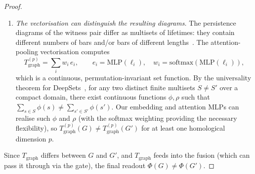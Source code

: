 \begin{proof}
\begin{enumerate}
    \item \emph{The vectorisation can distinguish the resulting diagrams.} The persistence diagrams of the witness pair differ as multisets of lifetimes: they contain different numbers of bars and/or bars of different lengths~\cite{hofer2023expressivity}. The attention-pooling vectorisation computes
    \[
        T^{(p)}_{\mathrm{graph}} = \sum_i w_i \, e_i, \qquad e_i = \mathrm{MLP}(\ell_i), \quad w_i = \mathrm{softmax}(\mathrm{MLP}(\ell_i)),
    \]
    which is a continuous, permutation-invariant set function. By the universality theorem for DeepSets~\cite{zaheer2017deep}, for any two distinct finite multisets $S \neq S'$ over a compact domain, there exist continuous functions $\phi, \rho$ such that $\sum_{s \in S} \phi(s) \neq \sum_{s' \in S'} \phi(s')$. Our embedding and attention MLPs can realise such $\phi$ and $\rho$ (with the softmax weighting providing the necessary flexibility), so $T^{(p)}_{\mathrm{graph}}(G) \neq T^{(p)}_{\mathrm{graph}}(G')$ for at least one homological dimension $p$.
\end{enumerate}

Since $T_{\mathrm{graph}}$ differs between $G$ and $G'$, and $T_{\mathrm{graph}}$ feeds into the fusion (which can pass it through via the gate), the final readout $\Phi(G) \neq \Phi(G')$.


\end{proof}
